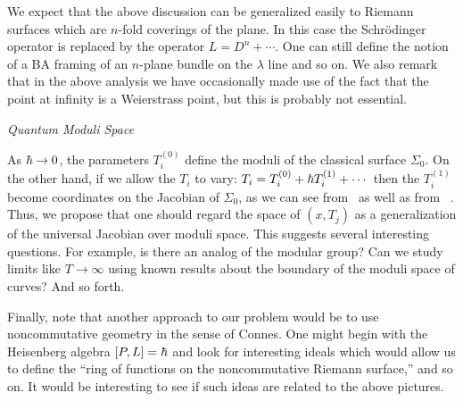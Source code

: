 We expect that the above discussion can be generalized easily
to Riemann surfaces which are $n$-fold coverings of the plane.
In this case the Schr\"odinger operator is replaced by 
the operator $L=D^n+\cdots$. One can still define the notion of a
BA framing of an $n$-plane bundle on the $\lambda$ line and so on. 
We also remark that in the above analysis we have occasionally 
made use of the fact that the point at infinity is a Weierstrass 
point, but this is probably not essential.


\bigskip
{\it Quantum Moduli Space}
 
As $\hbar\to 0$, the parameters $T^{(0)}_i$ 
define the moduli of the classical surface $\Sigma_0$. 
On the other hand, if we allow the $T_i$ to vary: 
$T_i=T_i^{(0)}+\hbar T_i^{(1)} +\cdots$ then the $T_i^{(1)}$ 
become coordinates on the Jacobian of $\Sigma_0$,
as we can see from \linsys\ as well as from \asympfi\ .
Thus, we propose that one should regard the space of 
$(x,T_j)$ as a generalization of the universal Jacobian 
over moduli space. This suggests several interesting questions. 
For example, is there an analog of the modular group?
Can we study limits like $T\to \infty$ using known 
results about the boundary of the moduli space of curves?
And so forth.

Finally, note that another approach to our problem would be
to use noncommutative geometry in the sense of Connes. One
might begin with the Heisenberg algebra $[P,L]=\hbar$ and 
look for interesting ideals which would allow us to define 
the ``ring of functions on the noncommutative Riemann surface,''
and so on. It would be interesting to see if such ideas are
related to the above pictures.



